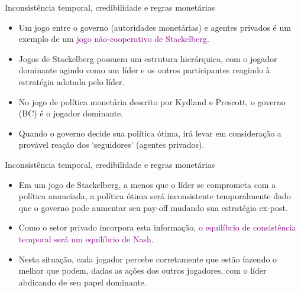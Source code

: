 \documentclass[10pt]{beamer}
\begin{document}
\begin{frame}{Inconsistência temporal, credibilidade e regras monetárias}
    \begin{itemize}
        \item Um jogo entre o governo (autoridades monetárias) e agentes privados é um exemplo de um \textcolor{purple}{jogo não-cooperativo de Stackelberg}.
        \bigskip
        \item Jogos de Stackelberg possuem um estrutura hierárquica, com o jogador dominante agindo como um líder e os outros participantes reagindo à estratégia adotada pelo líder.
        \bigskip
        \item No jogo de política monetária descrito por Kydland e Prescott, o governo (BC) é o jogador dominante.
        \bigskip
        \item Quando o governo decide sua política ótima, irá levar em consideração a provável reação dos `seguidores' (agentes privados).
    \end{itemize}
\end{frame}

\begin{frame}{Inconsistência temporal, credibilidade e regras monetárias}
    \begin{itemize}
        \item Em um jogo de Stackelberg, a menos que o líder se comprometa com a política anunciada, a política ótima será inconsistente temporalmente dado que o governo pode aumentar seu pay-off mudando sua estratégia ex-post.
        \bigskip
        \item Como o setor privado incorpora esta informação, \textcolor{purple}{o equilíbrio de consistência temporal será um equilíbrio de Nash}.
        \bigskip
        \item Nesta situação, cada jogador percebe corretamente que estão fazendo o melhor que podem, dadas as ações dos outros jogadores, com o líder abdicando de seu papel dominante.
    \end{itemize}
\end{frame}
\end{document}
